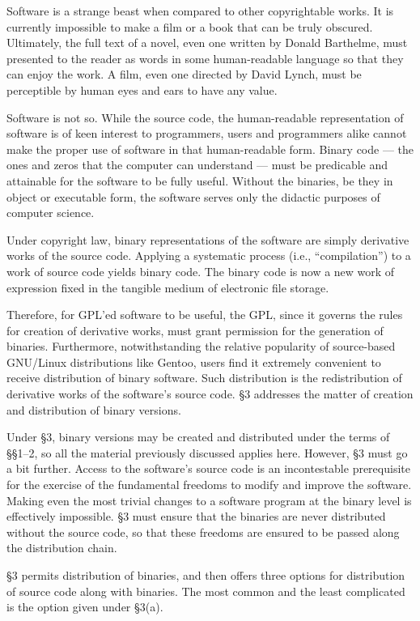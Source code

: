 \documentclass[12pt]{report}
\begin{document}
Software is a strange beast when compared to other copyrightable works.
It is currently impossible to make a film or a book that can be truly
obscured.  Ultimately, the full text of a novel, even one written by
Donald Barthelme, must presented to the reader as words in some
human-readable language so that they can enjoy the work.  A film, even one
directed by David Lynch, must be perceptible by human eyes and ears to
have any value.

Software is not so.  While the source code, the human-readable
representation of software is of keen interest to programmers, users and
programmers alike cannot make the proper use of software in that
human-readable form.  Binary code --- the ones and zeros that the computer
can understand --- must be predicable and attainable for the software to
be fully useful.  Without the binaries, be they in object or executable
form, the software serves only the didactic purposes of computer science.

Under copyright law, binary representations of the software are simply
derivative works of the source code.  Applying a systematic process (i.e.,
``compilation'') to a work of source code yields binary code.  The binary
code is now a new work of expression fixed in the tangible medium of
electronic file storage.

Therefore, for GPL'ed software to be useful, the GPL, since it governs the
rules for creation of derivative works, must grant permission for the
generation of binaries.  Furthermore, notwithstanding the relative
popularity of source-based GNU/Linux distributions like Gentoo, users find
it extremely convenient to receive distribution of binary software.  Such
distribution is the redistribution of derivative works of the software's
source code.  \S 3 addresses the matter of creation and distribution of
binary versions.

Under \S 3, binary versions may be created and distributed under the terms
of \S\S 1--2, so all the material previously discussed applies here.
However, \S 3 must go a bit further.  Access to the software's source code
is an incontestable prerequisite for the exercise of the fundamental
freedoms to modify and improve the software.  Making even the most trivial
changes to a software program at the binary level is effectively
impossible.  \S 3 must ensure that the binaries are never distributed
without the source code, so that these freedoms are ensured to be passed
along the distribution chain.

\S 3 permits distribution of binaries, and then offers three options for
distribution of source code along with binaries.  The most common and the
least complicated is the option given under \S 3(a).
\end{document}
